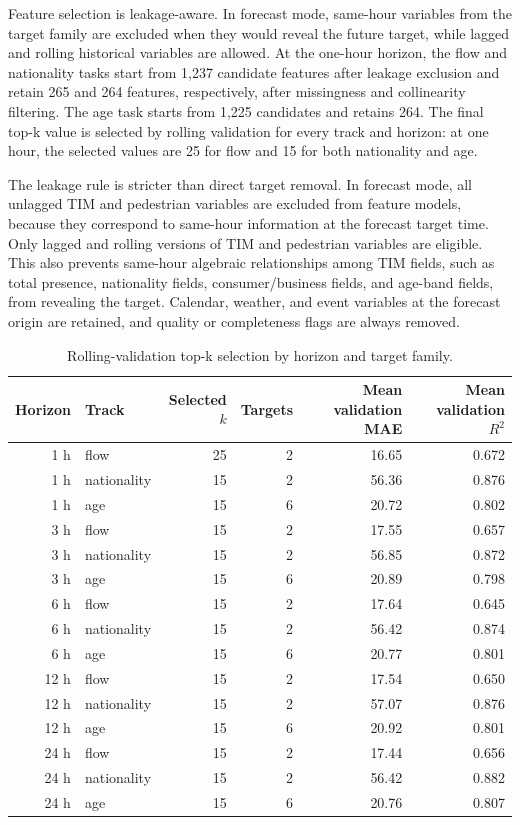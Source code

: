 Feature selection is leakage-aware. In forecast mode, same-hour variables from
the target family are excluded when they would reveal the future target, while
lagged and rolling historical variables are allowed. At the one-hour horizon,
the flow and nationality tasks start from 1,237 candidate features after leakage
exclusion and retain 265 and 264 features, respectively, after missingness and
collinearity filtering. The age task starts from 1,225 candidates and retains
264. The final top-k value is selected by rolling validation for every track and
horizon: at one hour, the selected values are 25 for flow and 15 for both
nationality and age.

The leakage rule is stricter than direct target removal. In forecast mode, all
unlagged TIM and pedestrian variables are excluded from feature models, because
they correspond to same-hour information at the forecast target time. Only
lagged and rolling versions of TIM and pedestrian variables are eligible. This
also prevents same-hour algebraic relationships among TIM fields, such as total
presence, nationality fields, consumer/business fields, and age-band fields,
from revealing the target. Calendar, weather, and event variables at the
forecast origin are retained, and quality or completeness flags are always
removed.

\begin{table}
\caption{Rolling-validation top-k selection by horizon and target family.}
\label{tab:top-k}
\centering
\scriptsize
\begin{tabular}{rlrrrr}
\toprule
Horizon & Track & Selected $k$ & Targets & Mean validation MAE & Mean validation $R^2$ \\
\midrule
1 h & flow & 25 & 2 & 16.65 & 0.672 \\
1 h & nationality & 15 & 2 & 56.36 & 0.876 \\
1 h & age & 15 & 6 & 20.72 & 0.802 \\
3 h & flow & 15 & 2 & 17.55 & 0.657 \\
3 h & nationality & 15 & 2 & 56.85 & 0.872 \\
3 h & age & 15 & 6 & 20.89 & 0.798 \\
6 h & flow & 15 & 2 & 17.64 & 0.645 \\
6 h & nationality & 15 & 2 & 56.42 & 0.874 \\
6 h & age & 15 & 6 & 20.77 & 0.801 \\
12 h & flow & 15 & 2 & 17.54 & 0.650 \\
12 h & nationality & 15 & 2 & 57.07 & 0.876 \\
12 h & age & 15 & 6 & 20.92 & 0.801 \\
24 h & flow & 15 & 2 & 17.44 & 0.656 \\
24 h & nationality & 15 & 2 & 56.42 & 0.882 \\
24 h & age & 15 & 6 & 20.76 & 0.807 \\
\bottomrule
\end{tabular}
\end{table}


